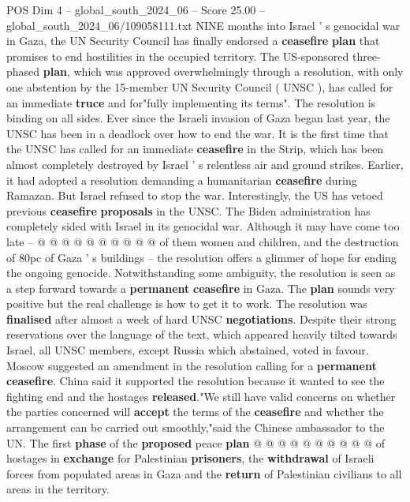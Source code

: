\begin{textsample}{POS Dim 4 – global\_south\_2024\_06 – Score 25.00 – global\_south\_2024\_06/109058111.txt}  \label{ex:f4_pos_085}
NINE months into Israel ' s genocidal war in Gaza, the UN Security Council has finally endorsed a \textbf{ceasefire} \textbf{plan} that promises to end hostilities in the occupied territory.
The US-sponsored three-phased \textbf{plan}, which was approved overwhelmingly through a resolution, with only one abstention by the 15-member UN Security Council ( UNSC ), has called for an immediate \textbf{truce} and for"fully implementing its terms".
The resolution is binding on all sides.
Ever since the Israeli invasion of Gaza began last year, the UNSC has been in a deadlock over how to end the war.
It is the first time that the UNSC has called for an immediate \textbf{ceasefire} in the Strip, which has been almost completely destroyed by Israel ' s relentless air and ground strikes.
Earlier, it had adopted a resolution demanding a humanitarian \textbf{ceasefire} during Ramazan.
But Israel refused to stop the war.
Interestingly, the US has vetoed previous \textbf{ceasefire} \textbf{proposals} in the UNSC.
The Biden administration has completely sided with Israel in its genocidal war.
Although it may have come too late -- @ @ @ @ @ @ @ @ @ @ of them women and children, and the destruction of 80pc of Gaza ' s buildings -- the resolution offers a glimmer of hope for ending the ongoing genocide.
Notwithstanding some ambiguity, the resolution is seen as a step forward towards a \textbf{permanent} \textbf{ceasefire} in Gaza.
The \textbf{plan} sounds very positive but the real challenge is how to get it to work.
The resolution was \textbf{finalised} after almost a week of hard UNSC \textbf{negotiations}.
Despite their strong reservations over the language of the text, which appeared heavily tilted towards Israel, all UNSC members, except Russia which abstained, voted in favour.
Moscow suggested an amendment in the resolution calling for a \textbf{permanent} \textbf{ceasefire}.
China said it supported the resolution because it wanted to see the fighting end and the hostages \textbf{released}."We still have valid concerns on whether the parties concerned will \textbf{accept} the terms of the \textbf{ceasefire} and whether the arrangement can be carried out smoothly,"said the Chinese ambassador to the UN.
The first \textbf{phase} of the \textbf{proposed} peace \textbf{plan} @ @ @ @ @ @ @ @ @ @ of hostages in \textbf{exchange} for Palestinian \textbf{prisoners}, the \textbf{withdrawal} of Israeli forces from populated areas in Gaza and the \textbf{return} of Palestinian civilians to all areas in the territory.

\end{textsample}
